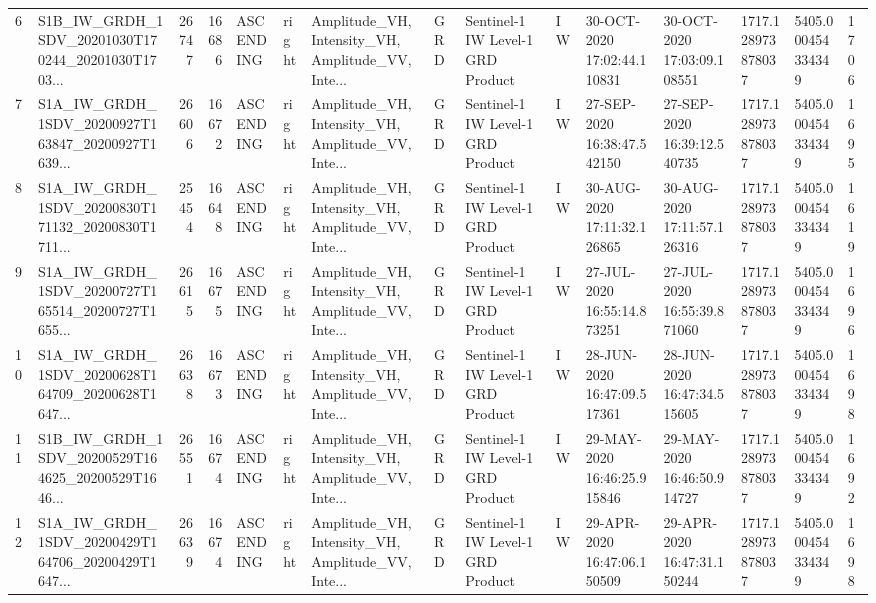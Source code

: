 \begin{tabular}{llrrlllllllllll}
6   &  S1B\_IW\_GRDH\_1SDV\_20201030T170244\_20201030T1703... &  26747 &   16686 &   ASCENDING &  right &  Amplitude\_VH, Intensity\_VH, Amplitude\_VV, Inte... &          GRD &  Sentinel-1 IW Level-1 GRD Product &              IW &  30-OCT-2020 17:02:44.110831 &  30-OCT-2020 17:03:09.108551 &          1717.128973878037 &  5405.000454334349 &       1706 \\
7   &  S1A\_IW\_GRDH\_1SDV\_20200927T163847\_20200927T1639... &  26606 &   16672 &   ASCENDING &  right &  Amplitude\_VH, Intensity\_VH, Amplitude\_VV, Inte... &          GRD &  Sentinel-1 IW Level-1 GRD Product &              IW &  27-SEP-2020 16:38:47.542150 &  27-SEP-2020 16:39:12.540735 &          1717.128973878037 &  5405.000454334349 &       1695 \\
8   &  S1A\_IW\_GRDH\_1SDV\_20200830T171132\_20200830T1711... &  25454 &   16648 &   ASCENDING &  right &  Amplitude\_VH, Intensity\_VH, Amplitude\_VV, Inte... &          GRD &  Sentinel-1 IW Level-1 GRD Product &              IW &  30-AUG-2020 17:11:32.126865 &  30-AUG-2020 17:11:57.126316 &          1717.128973878037 &  5405.000454334349 &       1619 \\
9   &  S1A\_IW\_GRDH\_1SDV\_20200727T165514\_20200727T1655... &  26615 &   16675 &   ASCENDING &  right &  Amplitude\_VH, Intensity\_VH, Amplitude\_VV, Inte... &          GRD &  Sentinel-1 IW Level-1 GRD Product &              IW &  27-JUL-2020 16:55:14.873251 &  27-JUL-2020 16:55:39.871060 &          1717.128973878037 &  5405.000454334349 &       1696 \\
10  &  S1A\_IW\_GRDH\_1SDV\_20200628T164709\_20200628T1647... &  26638 &   16673 &   ASCENDING &  right &  Amplitude\_VH, Intensity\_VH, Amplitude\_VV, Inte... &          GRD &  Sentinel-1 IW Level-1 GRD Product &              IW &  28-JUN-2020 16:47:09.517361 &  28-JUN-2020 16:47:34.515605 &          1717.128973878037 &  5405.000454334349 &       1698 \\
11  &  S1B\_IW\_GRDH\_1SDV\_20200529T164625\_20200529T1646... &  26551 &   16674 &   ASCENDING &  right &  Amplitude\_VH, Intensity\_VH, Amplitude\_VV, Inte... &          GRD &  Sentinel-1 IW Level-1 GRD Product &              IW &  29-MAY-2020 16:46:25.915846 &  29-MAY-2020 16:46:50.914727 &          1717.128973878037 &  5405.000454334349 &       1692 \\
12  &  S1A\_IW\_GRDH\_1SDV\_20200429T164706\_20200429T1647... &  26639 &   16674 &   ASCENDING &  right &  Amplitude\_VH, Intensity\_VH, Amplitude\_VV, Inte... &          GRD &  Sentinel-1 IW Level-1 GRD Product &              IW &  29-APR-2020 16:47:06.150509 &  29-APR-2020 16:47:31.150244 &          1717.128973878037 &  5405.000454334349 &       1698 \\

\end{tabular}
